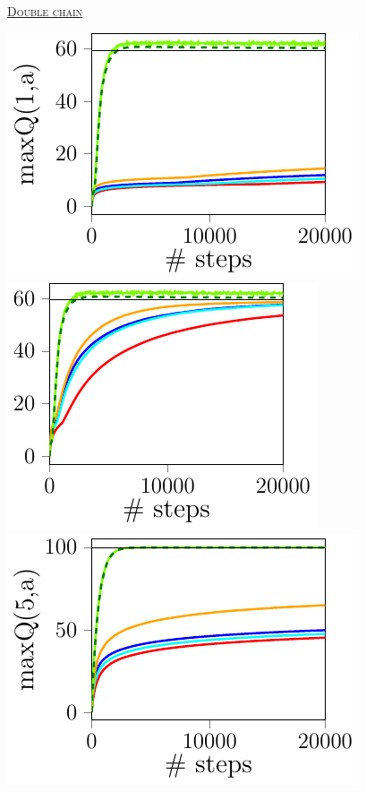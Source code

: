 \documentclass[portrait,a0paper,fontscale=0.312]{baposter}
\newcommand{\listhead}[1] {\textsc{\underline{#1}}}
\begin{document}
\begin{poster}
{\begin{minipage}{0.45\textwidth}
\begin{center}
\begin{minipage}{0.4\textwidth}
    \end{minipage}
  \end{center}
\end{minipage}  
\begin{center}
  \listhead{Double chain}\\
  \vspace{0.5cm}
  \begin{minipage}{0.33\textwidth}
    \includegraphics[scale=0.55]{./imgs/doubleChain/v1-1.pdf}
    \includegraphics[scale=0.55]{./imgs/doubleChain/v1-51.pdf}\\
    \includegraphics[scale=0.55]{./imgs/doubleChain/v5-1.pdf}

\end{minipage}
\end{center}}
\end{poster}
\end{document}
